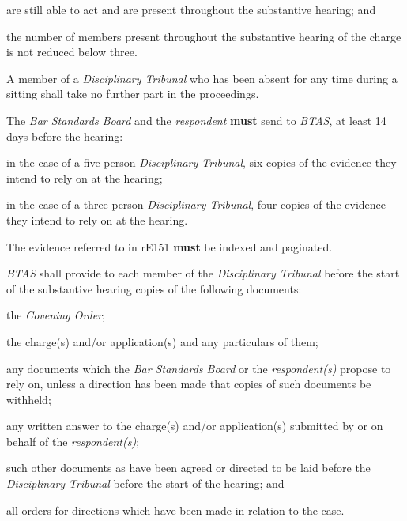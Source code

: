 are still able to act and are present throughout the substantive
hearing; and\item the number of members present throughout the substantive hearing of
the charge is not reduced below three.\ln
{}\par
A member of a \emph{Disciplinary Tribunal} who has been absent for any
time during a sitting shall take no further part in the proceedings.\\
\par
{}
The \emph{Bar Standards Board} and the \emph{respondent}  \textcolor{myred}{\textbf{must}} send
to \emph{BTAS}, at least 14 days before the hearing:\\\nl \item in the case of a five-person \emph{Disciplinary Tribunal}, six copies
of the evidence they intend to rely on at the hearing;\item in the case of a three-person \emph{Disciplinary Tribunal}, four
copies of the evidence they intend to rely on at the hearing.\ln
{}\par
The evidence referred to in rE151  \textcolor{myred}{\textbf{must}} be indexed and paginated.\\
\par
\emph{BTAS} shall provide to each member of the \emph{Disciplinary
Tribunal} before the start of the substantive hearing copies of the
following documents:\\\nl \item the \emph{Covening Order};\item the charge(s) and/or application(s) and any particulars of them;\item any documents which the \emph{Bar Standards Board} or
the \emph{respondent(s)} propose to rely on, unless a direction has been
made that copies of such documents be withheld;\item any written answer to the charge(s) and/or application(s) submitted
by or on behalf of the \emph{respondent(s)};\item such other documents as have been agreed or directed to be laid
before the \emph{Disciplinary Tribunal} before the start of the hearing;
and\item all orders for directions which have been made in relation to the
case.\ln
{}\par

